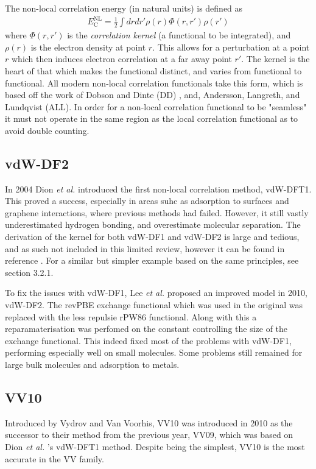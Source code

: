 \documentclass[10pt,a4paper,twocolumn,twoside]{extarticle}
\newcommand{\al}{\emph{et al. }}
\begin{document}
	The non-local correlation energy (in natural units) is defined as 
	\begin{align}
		E^\text{NL}_\text{C} = \frac{1}{2} \int dr dr' \rho(r) \Phi(r, r') \rho(r')
	\end{align}
	where $\Phi(r, r')$ is the \emph{correlation kernel} (a functional to be integrated), and $\rho(r)$ is the electron density at point $r$. This allows for a perturbation at a point $r$ which then induces electron correlation at a far away point $r'$. The kernel is the heart of that which makes the functional distinct, and varies from functional to functional. All modern non-local correlation functionals take this form, which is based off the work of Dobson and Dinte (DD) \cite{DD}, and, Andersson, Langreth, and Lundqvist (ALL)\cite{ALL}.
	In order for a non-local correlation functional to be "seamless" it must not operate in the same region as the local correlation functional as to avoid double counting. 

	\subsection{vdW-DF2}
	In 2004 Dion \al introduced the first non-local correlation method, vdW-DFT1. \cite{vdw04Original-Dion2004} This proved a success, especially in areas suhc as adsorption to surfaces and graphene interactions, where previous methods had failed. \cite{vdW-review} However, it still vastly underestimated hydrogen bonding, and overestimate molecular separation. The derivation of the kernel for both vdW-DF1 and vdW-DF2 is large and tedious, and as such not included in this limited review, however it can be found in reference \cite{vdw04Original-Dion2004}. For a similar but simpler example based on the same principles, see section 3.2.1.

	To fix the issues with vdW-DF1, Lee \al proposed an improved model in 2010, vdW-DF2. \cite{Lee2010-vdW-DF2-Original} The revPBE\cite{revPBE} exchange functional which was used in the original was replaced with the less repulsie rPW86 functional. \cite{rPW86} Along with this a reparamaterisation was perfomed on the constant controlling the size of the exchange functional. This indeed fixed most of the problems with vdW-DF1, performing especially well on small molecules. Some problems still remained for large bulk molecules and adsorption to metals. 


	\subsection{VV10}
	Introduced by Vydrov and Van Voorhis, VV10 was introduced in 2010 as the successor to their method from the previous year, VV09, which was based on Dion \al's vdW-DFT1 method.\cite{VV09Original-Vydrov2009}\cite{Vydrov2010} 
	Despite being the simplest, VV10 is the most accurate in the VV family.\cite{Grimme2011} 
\end{document}
